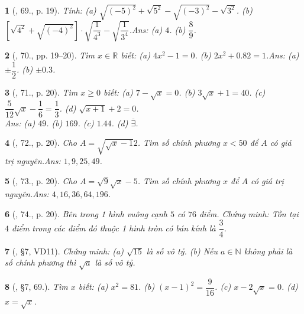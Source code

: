 \documentclass{article}
\newtheorem{baitoan}{}
\begin{document}
\begin{baitoan}[\cite{Tuyen_Toan_7}, 69., p. 19]
	Tính: (a) $\sqrt{(-5)^2} + \sqrt{5^2} - \sqrt{(-3)^2} - \sqrt{3^2}$. (b) $\left[\sqrt{4^2} + \sqrt{(-4)^2}\right]\cdot\sqrt{\dfrac{1}{4^3}} - \sqrt{\dfrac{1}{3^4}}$.\hfill{\sf Ans:} (a) $4$. (b) $\dfrac{8}{9}$.
\end{baitoan}

\begin{baitoan}[\cite{Tuyen_Toan_7}, 70., pp. 19--20]
	Tìm $x\in\mathbb{R}$ biết: (a) $4x^2 - 1 = 0$. (b) $2x^2 + 0.82 = 1$.\hfill{\sf Ans:} (a) $\pm\dfrac{1}{2}$. (b) $\pm0.3$.
\end{baitoan}

\begin{baitoan}[\cite{Tuyen_Toan_7}, 71., p. 20]
	Tìm $x\ge 0$ biết: (a) $7 - \sqrt{x} = 0$. (b) $3\sqrt{x} + 1 = 40$. (c) $\dfrac{5}{12}\sqrt{x} - \dfrac{1}{6} = \dfrac{1}{3}$. (d) $\sqrt{x + 1} + 2 = 0$.
	\\\mbox{}\hfill{\sf Ans:} (a) $49$. (b) $169$. (c) $1.44$. (d) $\overline{\exists}$.
\end{baitoan}

\begin{baitoan}[\cite{Tuyen_Toan_7}, 72., p. 20]
	Cho $A = \sqrt{\sqrt{x} - 1}{2}$. Tìm số chính phương $x < 50$ để $A$ có giá trị nguyên.\hfill{\sf Ans:} $1,9,25,49$.
\end{baitoan}

\begin{baitoan}[\cite{Tuyen_Toan_7}, 73., p. 20]
	Cho $A = \sqrt{9}{\sqrt{x} - 5}$. Tìm số chính phương $x$ để $A$ có giá trị nguyên.\hfill{\sf Ans:} $4,16,36,64,196$.
\end{baitoan}

\begin{baitoan}[\cite{Tuyen_Toan_7}, 74., p. 20]
	Bên trong 1 hình vuông cạnh $5$ có $76$ điểm. Chứng minh: Tồn tại $4$ điểm trong các điểm đó thuộc 1 hình tròn có bán kính là $\dfrac{3}{4}$.
\end{baitoan}

\begin{baitoan}[\cite{Binh_Toan_7_tap_1}, \S7, VD11]
	Chứng minh: (a) $\sqrt{15}$ là số vô tỷ. (b) Nếu $a\in\mathbb{N}$ không phải là số chính phương thì $\sqrt{a}$ là số vô tỷ.	
\end{baitoan}

\begin{baitoan}[\cite{Binh_Toan_7_tap_1}, \S7, 69.]
	Tìm $x$ biết: (a) $x^2 = 81$. (b) $(x - 1)^2 = \dfrac{9}{16}$. (c) $x - 2\sqrt{x} = 0$. (d) $x = \sqrt{x}$.	
\end{baitoan}
\end{document}
